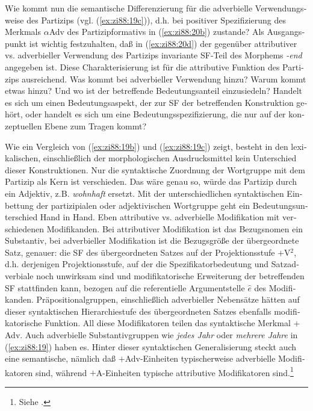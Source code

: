 \documentclass[output=paper,colorlinks,citecolor=brown, booklanguage=german]{langscibook}
\begin{document}
\begin{otherlanguage}{german}
Wie kommt nun die semantische Differenzierung für die adverbielle Verwendungsweise des Partizips (vgl. (\ref{ex:zi88:19c})), d.h. bei positiver Spezifizierung des Merkmals $\alpha$Adv des Partizipformativs in (\ref{ex:zi88:20b}) zustande? Als Ausgangspunkt ist wichtig festzuhalten, daß in (\ref{ex:zi88:20d}) der gegenüber attributiver vs. adverbieller Verwendung des Partizips invariante SF-Teil des Morphems \textit{-end} angegeben ist. Diese Charakterisierung ist für die attributive Funktion des Partizips ausreichend. Was kommt bei adverbieller Verwendung hinzu? Warum kommt etwas hinzu? Und wo ist der betreffende Bedeutungsanteil einzusiedeln? Handelt es sich um einen Bedeutungsaspekt, der zur SF der betreffenden Konstruktion gehört, oder handelt es sich um eine Bedeutungsspezifizierung, die nur auf der konzeptuellen Ebene zum Tragen kommt?

Wie ein Vergleich von (\ref{ex:zi88:19b}) und (\ref{ex:zi88:19c}) zeigt, besteht in den lexikalischen, einschließlich der morphologischen Ausdrucksmittel kein Unterschied dieser Konstruktionen. Nur die syntaktische Zuordnung der Wortgruppe mit dem Partizip als Kern ist verschieden. Das wäre genau so, würde das Partizip durch ein Adjektiv, z.B. \textit{wohnhaft} ersetzt. Mit der unterschiedlichen syntaktischen Einbettung der partizipialen oder adjektivischen Wortgruppe geht ein Bedeutungsunterschied Hand in Hand. Eben attributive vs. adverbielle Modifikation mit verschiedenen Modifikanden. Bei attributiver Modifikation ist das Bezugsnomen ein Substantiv, bei adverbieller Modifikation ist die Bezugsgröße der übergeordnete Satz, genauer: die SF des übergeordneten Satzes auf der Projektionsstufe $+$V$^2$, d.h. derjenigen Projektionsstufe, auf der die Spezifikatorbedeutung und Satzadverbiale noch unwirksam sind und modifikatorische Erweiterung der betreffenden SF stattfinden kann, bezogen auf die referentielle Argumentstelle $\hat{e}$ des Modifikanden. Präpositionalgruppen, einschließlich adverbieller Nebensätze hätten auf dieser syntaktischen Hierarchiestufe des übergeordneten Satzes ebenfalls modifikatorische Funktion. All diese Modifikatoren teilen das syntaktische Merkmal $+$Adv. Auch adverbielle Substantivgruppen wie \textit{jedes Jahr} oder \textit{mehrere Jahre} in (\ref{ex:zi88:19}) haben es. Hinter dieser syntaktischen Generalisierung steckt auch eine semantische, nämlich daß $+$Adv-Einheiten typischerweise adverbielle Modifikatoren sind, während $+$A-Einheiten typische attributive Modifikatoren sind.\footnote{Siehe \citet{Zimmermann1988-druck,Zimmermann1987d}.}


\end{otherlanguage}
\end{document}
